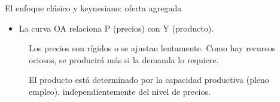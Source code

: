 \documentclass{beamer}
\begin{document}
\begin{frame}{El enfoque clásico y keynesiano: oferta agregada}

    \begin{itemize}
            \item La curva OA relaciona P (precios) con Y (producto).
    \end{itemize}
    \begin{center}
    \begin{figure}[H]
    \renewcommand{\figurename}{Figure}
    \begin{center}
        \begin{minipage}[b]{0.49\textwidth}
        \begin{center}
        \end{center}
        \begin{itemize}
        \footnotesize{
            \item Los precios son rígidos o se ajustan lentamente. Como hay recursos ociosos, se producirá más si la demanda lo requiere.
        }
        \end{itemize}
        
        \end{minipage}
        \begin{minipage}[b]{0.47\textwidth}
        \begin{center}
        \end{center}
        \begin{itemize}
        \footnotesize{
            \item El producto está determinado por la capacidad productiva (pleno empleo), independientemente del nivel de precios. 
        }
        \end{itemize}
        \end{minipage}
    \end{center}
    \end{figure}
    \end{center} 

\end{frame}
\end{document}
